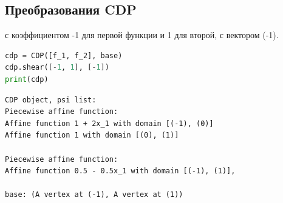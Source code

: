 \documentclass[fontsize=14pt]{scrartcl}
\theoremstyle{definition}
\begin{document}
\subsection{Преобразования CDP}

 с коэффициентом -1 для первой функции и 1 для второй, с вектором (-1).

\begin{lstlisting}[language=Python,style=python]
cdp = CDP([f_1, f_2], base)
cdp.shear([-1, 1], [-1])
print(cdp)
\end{lstlisting}


\begin{lstlisting}[style=output]
CDP object, psi list:
Piecewise affine function:
Affine function 1 + 2x_1 with domain [(-1), (0)]
Affine function 1 with domain [(0), (1)]

Piecewise affine function:
Affine function 0.5 - 0.5x_1 with domain [(-1), (1)],

base: (A vertex at (-1), A vertex at (1))
\end{lstlisting}
\end{document}
